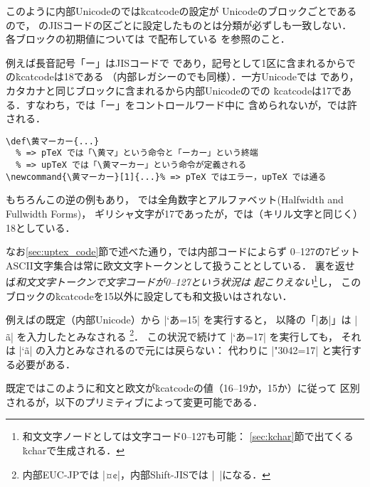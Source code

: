 \documentclass[a4paper,11pt,nomag,dvipdfmx]{jsarticle}
\begin{document}
このように内部Unicodeの\upTeX では\.{kcatcode}の設定が
Unicodeのブロックごとであるので，
\pTeX のJISコードの区ごとに設定したものとは分類が必ずしも一致しない．
各ブロックの初期値については
\href{https://github.com/texjporg/uptex-base}{}で配布している
を参照のこと．
\begin{dangerous}
例えば長音記号「ー」はJISコードで%
であり，記号として1区に含まれるから\pTeX での\.{kcatcode}は18である
（内部レガシーの\upTeX でも同様）．一方Unicodeでは%
であり，カタカナと同じブロックに含まれるから内部Unicodeの\upTeX での
\.{kcatcode}は17である．すなわち，\pTeX では「ー」をコントロールワード中に
含められないが，\upTeX では許される．
\begin{verbatim}
\def\黄マーカー{...}
  % => pTeX では「\黄マ」という命令と「ーカー」という終端
  % => upTeX では「\黄マーカー」という命令が定義される
\newcommand{\黄マーカー}[1]{...}% => pTeX ではエラー，upTeX では通る
\end{verbatim}
もちろんこの逆の例もあり，
\pTeX では全角数字とアルファベット(Halfwidth and Fullwidth Forms)，
ギリシャ文字が17であったが，\upTeX では（キリル文字と同じく）18としている．
\end{dangerous}

なお\ref{sec:uptex_code}節で述べた通り，\upTeX では内部コードによらず
0--127の7ビットASCII文字集合は常に欧文文字トークンとして扱うこととしている．
裏を返せば\emph{和文文字トークンで文字コードが0--127という状況は
起こりえない}\footnote{和文文字ノードとしては文字コード0--127も可能：
\ref{sec:kchar}節で出てくる\.{kchar}で生成される．}し，
このブロックの\.{kcatcode}を15以外に設定しても和文扱いはされない．
\begin{dangerous}
例えば\upTeX の既定（内部Unicode）から |\kcatcode`あ=15| を実行すると，
以降の「|あ|\relax」は |^^e3^^81^^82| を入力したとみなされる
\footnote{内部EUC-JPでは |^^a4^^a2|，内部Shift-JISでは |^^82^^a0|になる．}．
この状況で続けて |\kcatcode`あ=17| を実行しても，
それは |\kcatcode`^^e3^^81^^82| の入力とみなされるので元には戻らない：
代わりに |\kcatcode\ucs"3042=17| と実行する必要がある．
\end{dangerous}

既定ではこのように和文と欧文が\.{kcatcode}の値（16--19か，15か）に従って
区別されるが，以下のプリミティブによって変更可能である．
\end{document}
